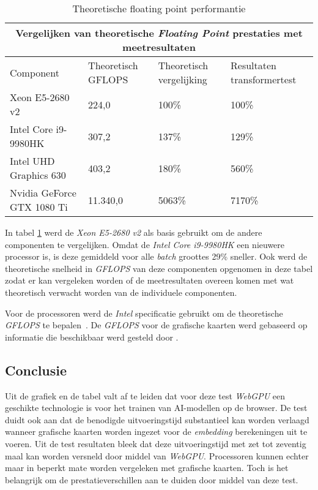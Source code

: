 \begin{table}[t]
    \begin{tabular}{ |p{5.5cm}|p{2.5cm}|p{2.5cm}|p{3.5cm}|  }
        \hline
        \multicolumn{4}{|c|}{Vergelijken van theoretische \textit{Floating Point} prestaties met meetresultaten} \\
        \hline
        Component& Theoretisch GFLOPS & Theoretisch vergelijking & Resultaten transformertest\\
        \hline
            Xeon E5-2680 v2             & 224,0     & 100\%  & 100\%       \\
            Intel Core i9-9980HK        & 307,2     & 137\%  & 129\%    \\
            Intel UHD Graphics 630      & 403,2     & 180\%  & 560\%    \\
            Nvidia GeForce GTX 1080 Ti  & 11.340,0  & 5063\% & 7170\%   \\
        \hline
    \end{tabular}
    \caption[\textit{Floating point} performantie \textit{CPU's} en \textit{GPU's} \autocite{Intel2024, Intel2024a, TechPowerUp2017, TechPowerUp2017a}]{Theoretische floating point performantie \autocite{Intel2024, Intel2024a, TechPowerUp2017, TechPowerUp2017a}}
    \label{tab:TheoreticalVersusMeasuredPerf}
\end{table}

In tabel \ref{tab:TheoreticalVersusMeasuredPerf} werd de \textit{Xeon E5-2680 v2} als basis gebruikt om de andere componenten te vergelijken. Omdat de \textit{Intel Core i9-9980HK} een nieuwere processor is, is deze gemiddeld voor alle \textit{batch} groottes 29\% sneller. Ook werd de theoretische snelheid in \textit{GFLOPS} van deze componenten opgenomen in deze tabel zodat er kan vergeleken worden of de meetresultaten overeen komen met wat theoretisch verwacht worden van de individuele componenten. 

\bigbreak{}

Voor de processoren werd de \textit{Intel} specificatie gebruikt om de theoretische \textit{GFLOPS} te bepalen~\autocite{Intel2024, Intel2024a}. De \textit{GFLOPS} voor de grafische kaarten werd gebaseerd op informatie die beschikbaar werd gesteld door \textcite{TechPowerUp2017, TechPowerUp2017a}.

\subsection{Conclusie}

Uit de grafiek en de tabel valt af te leiden dat voor deze test \textit{WebGPU} een geschikte technologie is voor het trainen van AI-modellen op de browser. De test duidt ook aan dat de benodigde uitvoeringstijd substantieel kan worden verlaagd wanneer grafische kaarten worden ingezet voor de \textit{embedding} berekeningen uit te voeren. Uit de test resultaten bleek dat deze uitvoeringstijd met zet tot zeventig maal kan worden versneld door middel van \textit{WebGPU}. Processoren kunnen echter maar in beperkt mate worden vergeleken met grafische kaarten. Toch is het belangrijk om de prestatieverschillen aan te duiden door middel van deze test. 

